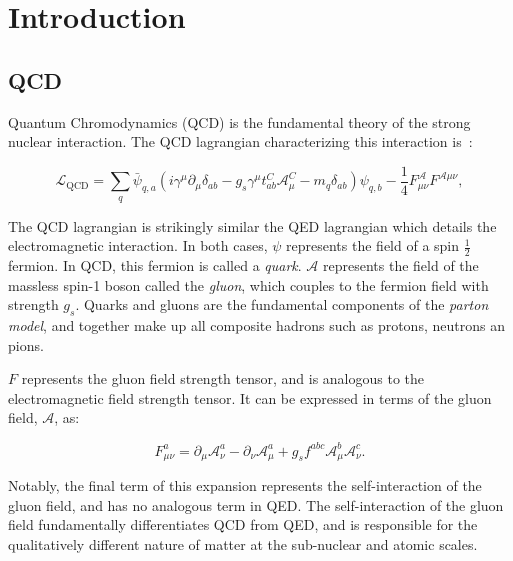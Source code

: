 





\chapter{Introduction}

\section{QCD}
\label{sec:QCD}
Quantum Chromodynamics (QCD) is the fundamental theory of the strong nuclear interaction. The QCD lagrangian characterizing this interaction is~\cite{and2010}:


\begin{equation}
  \mathcal{L}_\mathrm{QCD} = \sum_q \bar{\psi}_{q,a}\left(i\gamma^\mu\partial_\mu \delta_{ab} -g_s\gamma^\mu t^{C}_{ab} \mathcal{A}_\mu^C - m_q\delta_{ab}\right) \psi_{q,b} - \frac{1}{4}F^\mathcal{A}_{\mu\nu}F^{\mathcal{A}\mu\nu},
\label{eq:qcd_lagrangian}
\end{equation} 

The QCD lagrangian is strikingly similar the QED lagrangian which details the electromagnetic interaction. In both cases, $\psi$ represents the field of a spin $\frac{1}{2}$ fermion. In QCD, this fermion is called a \textit{quark}. $\mathcal{A}$ represents the field of the massless spin-1 boson called the \textit{gluon}, which couples to the fermion field with strength $g_s$. Quarks and gluons are the fundamental components of the \textit{parton model}, and together make up all composite hadrons such as protons, neutrons an pions.

$F$ represents the gluon field strength tensor, and is analogous to the electromagnetic field strength tensor. It can be expressed in terms of the gluon field, $\mathcal{A}$, as:

\begin{equation}
  F^a_{\mu \nu} = \partial_\mu \mathcal{A}^a_\nu - \partial_\nu \mathcal{A}^a_\mu + g_s f^{abc} \mathcal{A}^b_\mu \mathcal{A}^c_\nu.
\label{eq: gluon_tensor}
\end{equation}

Notably, the final term of this expansion represents the self-interaction of the gluon field, and has no analogous term in QED. The self-interaction of the gluon field fundamentally differentiates QCD from QED, and is responsible for the qualitatively different nature of matter at the sub-nuclear and atomic scales.

